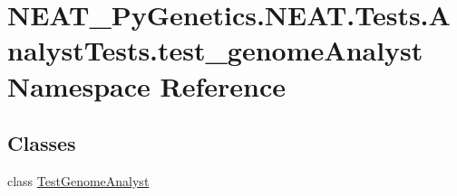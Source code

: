 \hypertarget{namespaceNEAT__PyGenetics_1_1NEAT_1_1Tests_1_1AnalystTests_1_1test__genomeAnalyst}{}\section{N\+E\+A\+T\+\_\+\+Py\+Genetics.\+N\+E\+A\+T.\+Tests.\+Analyst\+Tests.\+test\+\_\+genome\+Analyst Namespace Reference}
\label{namespaceNEAT__PyGenetics_1_1NEAT_1_1Tests_1_1AnalystTests_1_1test__genomeAnalyst}
\subsection*{Classes}
\begin{DoxyCompactItemize}
\item 
class \hyperlink{classNEAT__PyGenetics_1_1NEAT_1_1Tests_1_1AnalystTests_1_1test__genomeAnalyst_1_1TestGenomeAnalyst}{Test\+Genome\+Analyst}
\end{DoxyCompactItemize}
